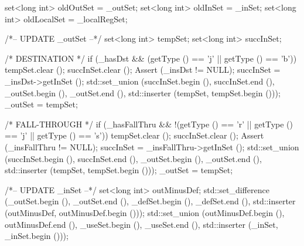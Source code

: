 \begin{DoxyCode}
                                                                                 
                                  {
    set<long int> oldOutSet = _outSet;
    set<long int> oldInSet = _inSet;
    set<long int> oldLocalSet = _localRegSet;

    /*-- UPDATE _outSet --*/
    set<long int> tempSet;
    set<long int> succInSet;

    /* DESTINATION */
    if (_hasDst && 
       (getType () == 'j' || getType () == 'b')) {
        tempSet.clear ();
        succInSet.clear ();
        Assert (_insDst != NULL);
        succInSet = _insDst->getInSet ();
        std::set_union (succInSet.begin (), succInSet.end (), 
                        _outSet.begin (), _outSet.end (), 
                        std::inserter (tempSet, tempSet.begin ()));
        _outSet = tempSet;
    }

    /* FALL-THROUGH */
    if (_hasFallThru &&
        !(getType () == 'r' || getType () == 'j' || getType () == 's')) {
        tempSet.clear ();
        succInSet.clear ();
        Assert (_insFallThru != NULL);
        succInSet = _insFallThru->getInSet ();
        std::set_union (succInSet.begin (), succInSet.end (), 
                        _outSet.begin (), _outSet.end (), 
                        std::inserter (tempSet, tempSet.begin ()));
        _outSet = tempSet;
    }

    /*-- UPDATE _inSet --*/
    set<long int> outMinusDef;
    std::set_difference (_outSet.begin (), _outSet.end (), 
                         _defSet.begin (), _defSet.end (), 
                         std::inserter (outMinusDef, outMinusDef.begin ()));
    std::set_union (outMinusDef.begin (), outMinusDef.end (), 
                    _useSet.begin (), _useSet.end (), 
                    std::inserter (_inSet, _inSet.begin ()));


}
\end{DoxyCode}
